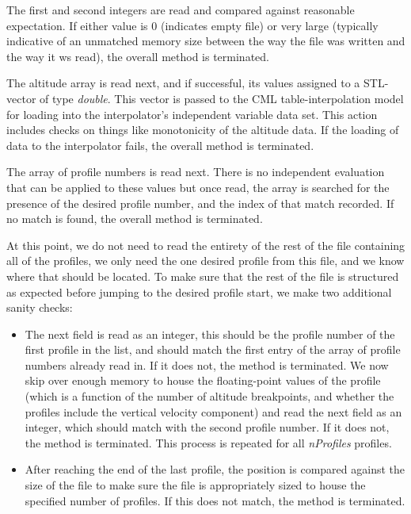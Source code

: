 \documentclass[11pt,fleqn]{report}
\begin{document}
The first and second integers are read and compared against reasonable
expectation. If either
value is 0 (indicates empty file) or very large (typically indicative of
an unmatched memory size between the way the file was written and the way it
ws read), the overall method is terminated.

The altitude array is read next, and if successful, its values assigned to a
STL-vector of type \textit{double}. This vector is passed to the CML
table-interpolation model for loading into the interpolator's independent
variable data set. This action includes checks on things like monotonicity
of the altitude data. If the loading of data to the interpolator fails, the
overall method is terminated.

The array of profile numbers is read next. There is no independent
evaluation that can be applied to these values but once read, the array is
searched for the presence of the desired profile number, and the index of
that match recorded. If no match is found, the overall method is terminated.

At this point, we do not need to read the entirety of the rest of the file
containing all of
the profiles, we only need the one desired profile from this file,
and we know where that should be
located. To make sure that the rest of the file is structured as expected
before jumping to the desired profile start, we make two additional sanity
checks:

\begin{itemize}
\item
The next field is read as an integer, this should be the profile number of
the first profile in the list, and should match the first entry of the array
of profile numbers already read in. If it does not, the method is
terminated. We now skip over enough memory to house the floating-point
values of the profile (which is a function of the number of altitude
breakpoints, and whether the profiles include the vertical velocity
component) and read the next field as an integer, which should match with
the second profile number. If it does not, the method is terminated. This
process is repeated for all \textit{nProfiles} profiles.
\item
After reaching the end of the last profile, the position is compared
against the size of the file to make sure the file is appropriately sized
to house the specified number of profiles. If this does not match, the
method is terminated.
\end{itemize}
\end{document}
